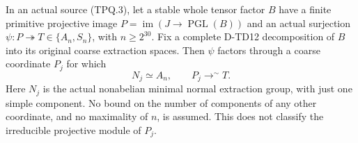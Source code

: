 \begin{corollary}
In an actual source (TPQ.3), let a stable whole tensor factor $B$
have a finite primitive projective image
$P=\operatorname{im}(J\to\operatorname{PGL}(B))$ and an actual
surjection $\psi:P\twoheadrightarrow T\in\{A_n,S_n\}$,
with $n\ge2^{30}$. Fix a complete D-TD12 decomposition of $B$
into its original coarse extraction spaces. Then $\psi$ factors
through a coarse coordinate $P_j$ for which
\[
             N_j\simeq A_n,
             \qquad P_j\mathop{\longrightarrow}^{\sim}T.
 \tag{TPQ.13}
\]
Here $N_j$ is the actual nonabelian minimal normal extraction group,
with just one simple component. No bound on the number of components
of any other coordinate, and no maximality of $n$, is assumed.
This does not classify the irreducible projective module of $P_j$.
\end{corollary}

